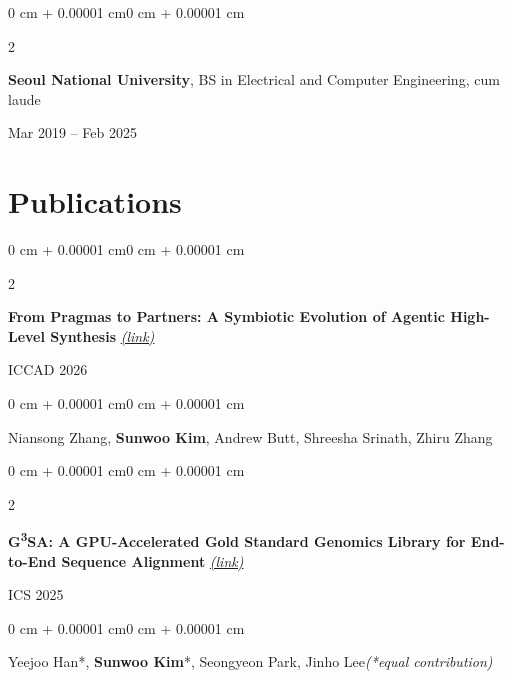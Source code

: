 \documentclass[10pt, letterpaper]{article}
\newenvironment{onecolentry}{
    \begin{adjustwidth}{0 cm + 0.00001 cm}{0 cm + 0.00001 cm}
}{
    \end{adjustwidth}
}
\newenvironment{twocolentry}[2][]{
    \onecolentry
    \def\secondColumn{#2}
    \setcolumnwidth{\fill, 3.4 cm}
    \begin{paracol}{2}
}{
    \switchcolumn \raggedleft \secondColumn
    \end{paracol}
    \endonecolentry
}
\begin{document}
        \vspace{0.18 cm}

        \begin{twocolentry}{Mar 2019 -- Feb 2025}
            \textbf{Seoul National University}, BS in Electrical and Computer Engineering, cum laude
        \end{twocolentry}


    \section{Publications}

        \begin{samepage}
            \begin{twocolentry}{ICCAD 2026}
                \textbf{From Pragmas to Partners: A Symbiotic Evolution of Agentic High-Level Synthesis} \href{https://doi.org/10.1145/3831252.3845856}{\small\textit{(link)}}
            \end{twocolentry}

            \vspace{0.10 cm}
            \begin{onecolentry}
                Niansong Zhang, \textbf{Sunwoo Kim}, Andrew Butt, Shreesha Srinath, Zhiru Zhang
            \end{onecolentry}
        \end{samepage}

        \vspace{0.25 cm}

        \begin{samepage}
            \begin{twocolentry}{ICS 2025}
                \textbf{G\textsuperscript{3}SA: A GPU-Accelerated Gold Standard Genomics Library for End-to-End Sequence Alignment} \href{https://doi.org/10.1145/3721145.3729516}{\small\textit{(link)}}
            \end{twocolentry}

            \vspace{0.10 cm}
            \begin{onecolentry}
                Yeejoo Han*, \textbf{Sunwoo Kim}*, Seongyeon Park, Jinho Lee\quad\textit{(*equal contribution)}
            \end{onecolentry}
        \end{samepage}


\end{document}
